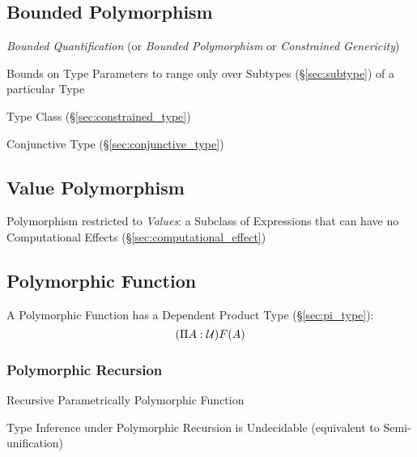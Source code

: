 \subsection{Bounded Polymorphism}\label{sec:bounded_polymorphism}

\emph{Bounded Quantification} (or \emph{Bounded Polymorphism} or
\emph{Constrained Genericity})

Bounds on Type Parameters to range only over Subtypes
(\S\ref{sec:subtype}) of a particular Type

Type Class (\S\ref{sec:constrained_type})

Conjunctive Type (\S\ref{sec:conjunctive_type})



\subsection{Value Polymorphism}\label{sec:value_polymorphism}

Polymorphism restricted to \emph{Values}: a Subclass of Expressions
that can have no Computational Effects
(\S\ref{sec:computational_effect})



\subsection{Polymorphic Function}\label{sec:polymorphic_function}

A Polymorphic Function has a Dependent Product Type
(\S\ref{sec:pi_type}):
\[
  (\Pi A:\mathcal{U}) F(A)
\]



\subsubsection{Polymorphic Recursion}\label{sec:polymorphic_recursion}

Recursive Parametrically Polymorphic Function

Type Inference under Polymorphic Recursion is Undecidable (equivalent
to Semi-unification) %



